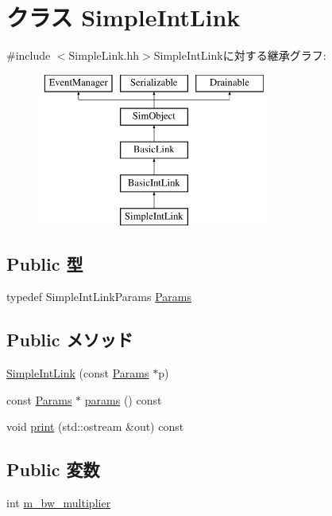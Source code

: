 \hypertarget{classSimpleIntLink}{
\section{クラス SimpleIntLink}
\label{classSimpleIntLink}
}


{\ttfamily \#include $<$SimpleLink.hh$>$}SimpleIntLinkに対する継承グラフ:\begin{figure}[H]
\begin{center}
\leavevmode
\includegraphics[height=5cm]{classSimpleIntLink}
\end{center}
\end{figure}
\subsection*{Public 型}
\begin{DoxyCompactItemize}
\item 
typedef SimpleIntLinkParams \hyperlink{classSimpleIntLink_a16df42348b8967c4cc4aa2b9c9fafdf9}{Params}
\end{DoxyCompactItemize}
\subsection*{Public メソッド}
\begin{DoxyCompactItemize}
\item 
\hyperlink{classSimpleIntLink_a964bbc17307fe8f150fcdddf39268d65}{SimpleIntLink} (const \hyperlink{classSimpleIntLink_a16df42348b8967c4cc4aa2b9c9fafdf9}{Params} $\ast$p)
\item 
const \hyperlink{classSimpleIntLink_a16df42348b8967c4cc4aa2b9c9fafdf9}{Params} $\ast$ \hyperlink{classSimpleIntLink_acd3c3feb78ae7a8f88fe0f110a718dff}{params} () const 
\item 
void \hyperlink{classSimpleIntLink_ac55fe386a101fbae38c716067c9966a0}{print} (std::ostream \&out) const 
\end{DoxyCompactItemize}
\subsection*{Public 変数}
\begin{DoxyCompactItemize}
\item 
int \hyperlink{classSimpleIntLink_a543e68bab5d8c6ed00c96039e2ef62fd}{m\_\-bw\_\-multiplier}
\end{DoxyCompactItemize}
